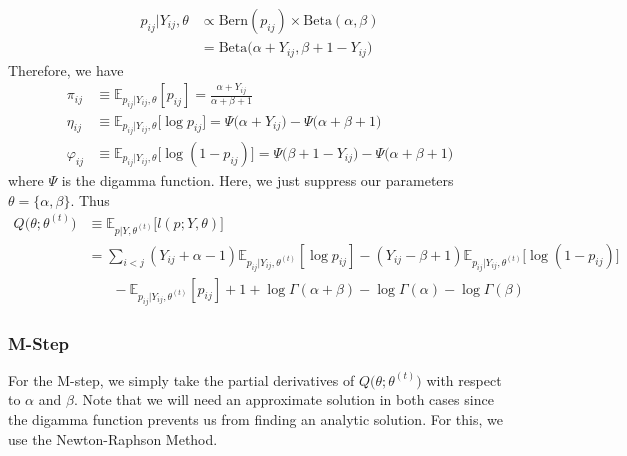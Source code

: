 \documentclass{article}
\begin{document}
\begin{align*}
p_{ij} | Y_{ij}, \theta &\propto \text{Bern}(p_{ij})\times \text{Beta}(\alpha, \beta)\\
&= \text{Beta}\Big(\alpha + Y_{ij}, \beta + 1 - Y_{ij}\Big)
\end{align*}
Therefore, we have
\begin{align*}
\pi_{ij} &\equiv \mathbb{E}_{p_{ij} | Y_{ij}, \theta} [p_{ij}] = \frac{\alpha + Y_{ij}}{\alpha + \beta + 1} \\
\eta_{ij} &\equiv \mathbb{E}_{p_{ij} | Y_{ij}, \theta} \big[\log p_{ij}\big] = \Psi\Big(\alpha + Y_{ij}\Big) - \Psi\Big(\alpha + \beta + 1\Big) \\
\varphi_{ij} &\equiv \mathbb{E}_{p_{ij} | Y_{ij}, \theta} \big[\log (1 - p_{ij})\big] = \Psi\Big(\beta + 1 - Y_{ij}\Big) - \Psi\Big(\alpha + \beta + 1\Big)
\end{align*}
where $\Psi$ is the digamma function. Here, we just suppress our parameters $\theta = \{\alpha, \beta\}$. Thus
\begin{align*}
Q\big(\theta; \theta^{(t)}\big) &\equiv \mathbb{E}_{p | Y, \theta^{(t)}} \Big[l(p; Y, \theta)\Big] \\
&= \sum_{i<j} (Y_{ij} + \alpha - 1) \mathbb{E}_{p_{ij} | Y_{ij}, \theta^{(t)}} [\log  p_{ij}] - (Y_{ij} - \beta + 1) \mathbb{E}_{p_{ij} | Y_{ij}, \theta^{(t)}} \big[\log (1-p_{ij})\big] \\
&\ \ \ \ \ \ \ \ - \mathbb{E}_{p_{ij} | Y_{ij}, \theta^{(t)}} [p_{ij}] + 1 + \log \Gamma(\alpha + \beta) - \log \Gamma(\alpha) - \log \Gamma(\beta) \tag{E}
\end{align*}

\subsubsection{M-Step}

For the M-step, we simply take the partial derivatives of $Q\big(\theta; \theta^{(t)}\big)$ with respect to $\alpha$ and $\beta$. Note that we will need an approximate solution in both cases since the digamma function prevents us from finding an analytic solution. For this, we use the Newton-Raphson Method.
\end{document}
